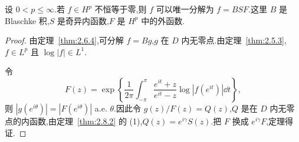 \begin{theorem}\label{thm:2.8.3}
设 $0 < p \leq \infty$.若 $f \in H^{p}$ 不恒等于零,则 $f$ 可以唯一分解为 $f = BSF$.这里 $B$ 是 Blaschke 积,$S$ 是奇异内函数,$F$ 是 $H^{p}$ 中的外函数.
\end{theorem}

\begin{proof}
由定理~\ref{thm:2.6.4},可分解 $f = Bg$,$g$ 在 $D$ 内无零点.由定理~\ref{thm:2.5.3},$f \in L^{p}$ 且 $\log|f| \in L^{1}$.

令
\begin{equation*}
F(z) = \exp\left\{\frac{1}{2\pi}\int_{-\pi}^{\pi}\frac{e^{it} + z}{e^{it} - z}\log|f(e^{it})|\dd t\right\},
\end{equation*}
则 $|g(e^{i\theta})| = |F(e^{i\theta})|$ a.e. $\theta$.因此令 $g(z)/F(z) = Q(z)$,$Q$ 是在 $D$ 内无零点的内函数,由定理~\ref{thm:2.8.2} 的 (1),$Q(z) = e^{i\gamma}S(z)$.把 $F$ 换成 $e^{i\gamma}F$,定理得证.
\end{proof}
